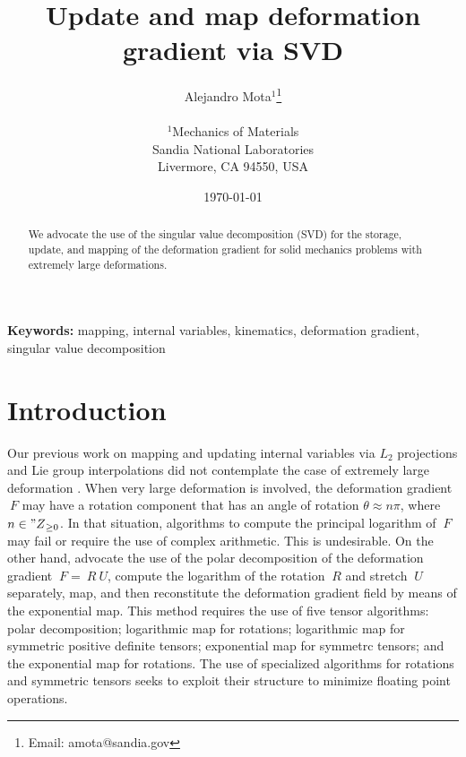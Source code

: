 \documentclass{article}
\newcommand{\svd}{\textsc{SVD}}
\providecommand{\keywords}[1]{\textbf{Keywords:} #1}
\begin{document}
\pagestyle{fancyplain}



\title{Update and map deformation gradient via SVD}

\author{\Large Alejandro Mota$^1$\thanks{Email: amota@sandia.gov}
  \\
  \\
  $^1$Mechanics of Materials\\
  Sandia National Laboratories\\
  Livermore, CA 94550, USA\\
}

\date{\today}

\maketitle

\begin{abstract}
  We advocate the use of the singular value decomposition (\svd{}) for
  the storage, update, and mapping of the deformation gradient for
  solid mechanics problems with extremely large deformations.
\end{abstract}

\keywords{mapping, internal variables, kinematics, deformation
  gradient, singular value decomposition}

\section{Introduction}
\label{sec:intro}

Our previous work on mapping and updating internal variables via $L_2$
projections and Lie group interpolations did not contemplate the case
of extremely large deformation \autocite{Mota.etal:2013}. When very
large deformation is involved, the deformation gradient $~F$ may have
a rotation component that has an angle of rotation
$\theta \approx n \pi$, where $n \in {"Z}_{\ge 0}$. In that situation,
algorithms to compute the principal logarithm of $~F$ may fail or
require the use of complex arithmetic. This is undesirable. On the
other hand, \textcite{Mota.etal:2013} advocate the use of the polar
decomposition of the deformation gradient $~F = ~R ~U$, compute the
logarithm of the rotation $~R$ and stretch $~U$ separately, map, and
then reconstitute the deformation gradient field by means of the
exponential map. This method requires the use of five tensor
algorithms: polar decomposition; logarithmic map for rotations;
logarithmic map for symmetric positive definite tensors; exponential
map for symmetrc tensors; and the exponential map for rotations. The
use of specialized algorithms for rotations and symmetric tensors
seeks to exploit their structure to minimize floating point
operations.
\end{document}
